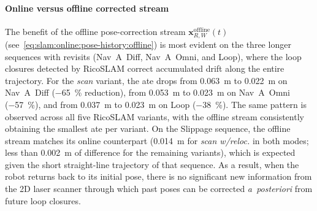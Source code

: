 \paragraph{Online versus offline corrected stream}
The benefit of the offline pose-correction stream
$\mathbf{x}_{R,W}^{\mathrm{offline}}(t)$
(see~\eqref{eq:slam:online:pose-history:offline}) is most evident on
the three longer sequences with revisits (Nav~A~Diff, Nav~A~Omni, and Loop),
where the loop closures detected by RicoSLAM correct accumulated drift along
the entire trajectory. For the \emph{scan} variant, the \gls{ate} drops from
\SI{0.063}{\metre} to \SI{0.022}{\metre} on Nav~A~Diff
(\SI{-65}{\percent} reduction), from \SI{0.053}{\metre} to
\SI{0.023}{\metre} on Nav~A~Omni (\SI{-57}{\percent}), and from
\SI{0.037}{\metre} to \SI{0.023}{\metre} on Loop (\SI{-38}{\percent}).
The same pattern is observed across all five RicoSLAM variants, with
the offline stream consistently obtaining the smallest \gls{ate} per variant.
On the Slippage sequence, the offline stream matches its online counterpart
(\SI{0.014}{\metre} for \emph{scan w/reloc.} in both modes; less than
\SI{0.002}{\metre} of difference for the remaining variants), which is expected
given the short straight-line trajectory of that sequence. As a result,
when the robot returns back to its initial pose, there is no significant
new information from the 2D laser scanner through which past poses can be
corrected \emph{a~posteriori} from future loop closures.

